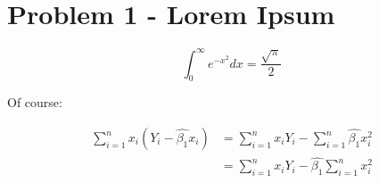 \documentclass{mcgillhomework}
\begin{document}
\createtitlepage

\pagestyle{mainmatter}

\section{Problem 1 - Lorem Ipsum}

\lipsum[66]

$$\int_0^\infty e^{-x^2} dx=\frac{\sqrt{\pi}}{2}$$ 

Of course:

\[
    \begin{split}
        \sum_{i = 1}^{n} {x_i (Y_i - \hat{\beta_1} x_i)}
        &= \sum_{i = 1}^{n} {x_i Y_i}
        - \sum_{i = 1}^{n} \hat{\beta_1} x_i^2
        \\
        &= \sum_{i = 1}^{n} {x_i Y_i}
        - \hat{\beta_1}\sum_{i = 1}^{n} x_i^2
    \end{split}
\]

\lipsum[73]
\end{document}

